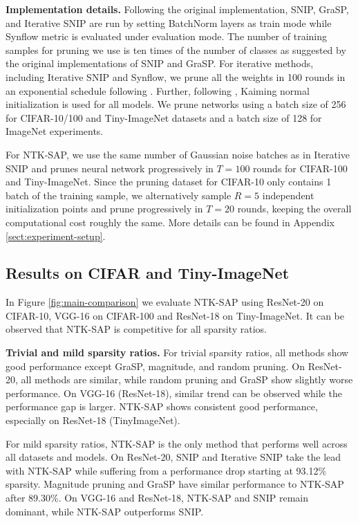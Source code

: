 \documentclass{article} %
\begin{document}
\textbf{Implementation details.} Following the original implementation, SNIP, GraSP, and Iterative SNIP are run by setting BatchNorm layers as train mode while Synflow metric is evaluated under evaluation mode. The number of training samples for pruning we use is ten times of the number of classes as suggested by the original implementations of SNIP and GraSP. For iterative methods, including Iterative SNIP and Synflow, we prune all the weights in 100 rounds in an exponential schedule following \citet{synflow, franklemissing}. Further, following \citet{franklemissing}, Kaiming normal initialization is used for all models. We prune networks using a batch size of 256 for CIFAR-10/100 and Tiny-ImageNet datasets and a batch size of 128 for ImageNet experiments.

For NTK-SAP, we use the same number of Gaussian noise batches as in Iterative SNIP and prunes neural network progressively in $T=100$ rounds for CIFAR-100 and Tiny-ImageNet. Since the pruning dataset for CIFAR-10 only contains 1 batch of the training sample, we alternatively sample $R=5$ independent initialization points and prune progressively in $T=20$ rounds, keeping the overall computational cost roughly the same. More details can be found in Appendix \ref{sect:experiment-setup}. 

\subsection{Results on CIFAR and Tiny-ImageNet} \label{sect:cifar-tiny}
In Figure \ref{fig:main-comparison} we evaluate NTK-SAP using ResNet-20 on CIFAR-10, VGG-16 on CIFAR-100 and ResNet-18 on Tiny-ImageNet. It can be observed that NTK-SAP is competitive for all sparsity ratios.


\textbf{Trivial and mild sparsity ratios.} For trivial sparsity ratios, all methods show good performance except GraSP, magnitude, and random pruning. On ResNet-20, all methods are similar, while random pruning and GraSP show slightly worse performance. On VGG-16 (ResNet-18), similar trend can be observed while the performance gap is larger. NTK-SAP shows consistent good performance, especially on ResNet-18 (TinyImageNet).

For mild sparsity ratios, NTK-SAP is the only method that performs well across all datasets and models. On ResNet-20, SNIP and Iterative SNIP take the lead with NTK-SAP while suffering from a performance drop starting at 93.12\% sparsity. Magnitude pruning and GraSP have similar performance to NTK-SAP after 89.30\%. On VGG-16 and ResNet-18, NTK-SAP and SNIP remain dominant, while NTK-SAP outperforms SNIP.
\end{document}
